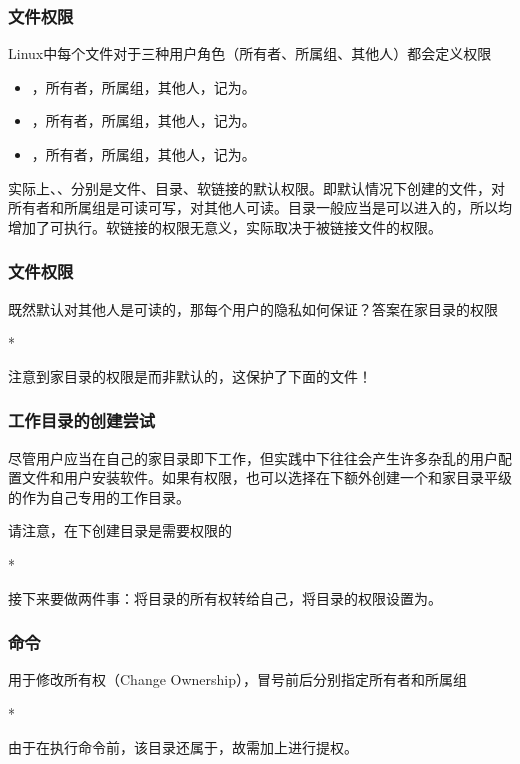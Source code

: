 \begin{frame}
    \frametitle{文件权限}
    Linux中每个文件对于三种用户角色（所有者、所属组、其他人）都会定义权限
    \begin{itemize}
        \item {}，所有者，所属组，其他人，记为。
        \item {}，所有者，所属组，其他人，记为。
        \item {}，所有者，所属组，其他人，记为。
    \end{itemize}
    实际上、、分别是文件、目录、软链接的默认权限。即默认情况下创建的文件，对所有者和所属组是可读可写，对其他人可读。目录一般应当是可以进入的，所以均增加了可执行。软链接的权限无意义，实际取决于被链接文件的权限。
\end{frame}

\begin{frame}
    \frametitle{文件权限}
    既然默认对其他人是可读的，那每个用户的隐私如何保证？答案在家目录的权限
    \begin{Code}*
        
    \end{Code}
    注意到家目录的权限是而非默认的，这保护了下面的文件！
\end{frame}

\begin{frame}
    \frametitle{工作目录的创建尝试}
    尽管用户应当在自己的家目录\code{\~}即下工作，但实践中\code{\~}下往往会产生许多杂乱的用户配置文件和用户安装软件。如果有权限，也可以选择在下额外创建一个和家目录平级的作为自己专用的工作目录。

    请注意，在下创建目录是需要权限的
    \begin{Code}*
        
    \end{Code}
    接下来要做两件事：将目录的所有权转给自己，将目录的权限设置为。
\end{frame}

\begin{frame}
    \frametitle{命令}
    用于修改所有权（Change Ownership），冒号前后分别指定所有者和所属组
    \begin{Code}*
        
    \end{Code}
    由于在执行命令前，该目录还属于，故需加上进行提权。
\end{frame}

